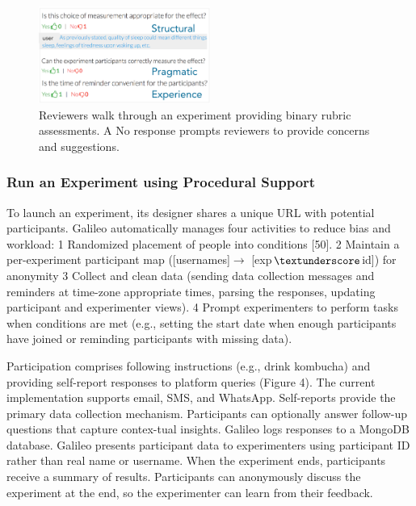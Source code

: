 \begin{figure}[h] 
  \centering
  \includegraphics[width=0.5\textwidth]{figures/galileo/galileo-2-review}
  \caption[]
{Reviewers walk through an experiment providing binary rubric assessments. A No response prompts reviewers to provide concerns and suggestions.}
  \label{fig:galileo-2-review}
\end{figure}

\subsubsection{Run an Experiment using Procedural Support}
To launch an experiment, its designer shares a unique URL with potential participants. Galileo automatically manages four activities to reduce bias and workload: 
1 Randomized placement of people into conditions [50].
2 Maintain a per-experiment participant map ([usernames]$\rightarrow$ [exp$\textunderscore$id]) for anonymity
3 Collect and clean data (sending data collection messages and reminders at time-zone appropriate times, parsing the responses, updating participant and experimenter views). 
4 Prompt experimenters to perform tasks when conditions are met (e.g., setting the start date when enough participants have joined or reminding participants with missing data). 

Participation comprises following instructions (e.g., drink kombucha) and providing self-report responses to platform queries (Figure 4). The current implementation supports email, SMS, and WhatsApp. Self-reports provide the primary data collection mechanism. Participants can optionally answer follow-up questions that capture contex-tual insights. Galileo logs responses to a MongoDB database. Galileo presents participant data to experimenters using participant ID rather than real name or username. When the experiment ends, participants receive a summary of results. Participants can anonymously discuss the experiment at the end, so the experimenter can learn from their feedback. 

